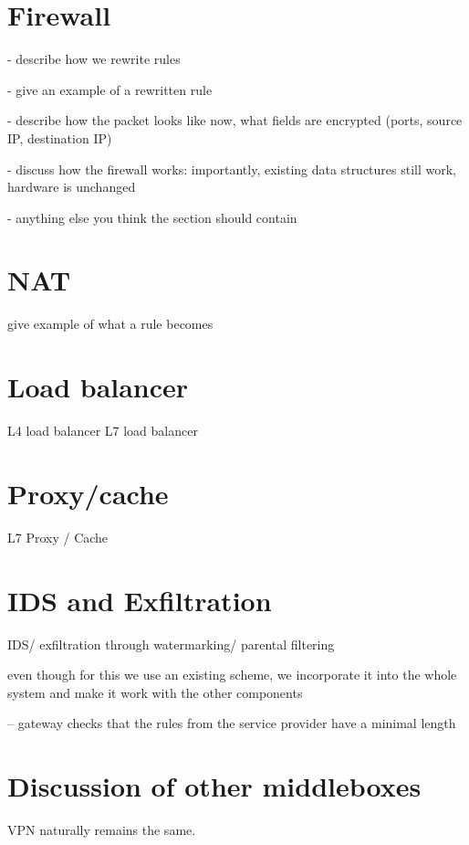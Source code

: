 
\section{Firewall}\label{sec:firewall}

- describe how we rewrite rules 

- give an example of a rewritten rule

- describe how the packet looks like now, what fields are encrypted (ports, source IP, destination IP)

- discuss how the firewall works: importantly, existing data structures still work, hardware is unchanged

- anything else you think the section should contain

\section{NAT}\label{sec:nat}

give example of what a rule becomes

\section{Load balancer}\label{sec:loadb}

L4 load balancer
L7 load balancer

\section{Proxy/cache}\label{sec:proxy}

L7 Proxy / Cache

\section{IDS and Exfiltration}\label{sec:IDS}

IDS/ exfiltration through watermarking/ parental filtering

even though for this we use an existing scheme, we incorporate it into the whole
system and make it work with the other components

-- gateway checks that the rules from the service provider have a minimal length 


\section{Discussion of other middleboxes}\label{sec:vpn} \label{sec:other} \label{sec:not_supp}

VPN naturally remains the same. 